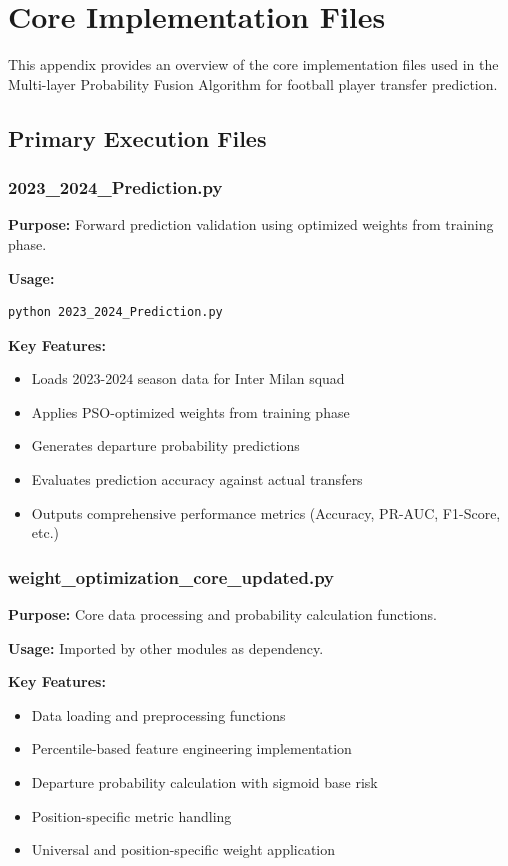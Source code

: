\appendix

\section{Core Implementation Files}

This appendix provides an overview of the core implementation files used in the Multi-layer Probability Fusion Algorithm for football player transfer prediction.

\subsection{Primary Execution Files}

\subsubsection{2023\_2024\_Prediction.py}
\textbf{Purpose:} Forward prediction validation using optimized weights from training phase.

\textbf{Usage:}
\begin{verbatim}
python 2023_2024_Prediction.py
\end{verbatim}

\textbf{Key Features:}
\begin{itemize}
\item Loads 2023-2024 season data for Inter Milan squad
\item Applies PSO-optimized weights from training phase
\item Generates departure probability predictions
\item Evaluates prediction accuracy against actual transfers
\item Outputs comprehensive performance metrics (Accuracy, PR-AUC, F1-Score, etc.)
\end{itemize}

\subsubsection{weight\_optimization\_core\_updated.py}
\textbf{Purpose:} Core data processing and probability calculation functions.

\textbf{Usage:} Imported by other modules as dependency.

\textbf{Key Features:}
\begin{itemize}
\item Data loading and preprocessing functions
\item Percentile-based feature engineering implementation
\item Departure probability calculation with sigmoid base risk
\item Position-specific metric handling
\item Universal and position-specific weight application
\end{itemize}


